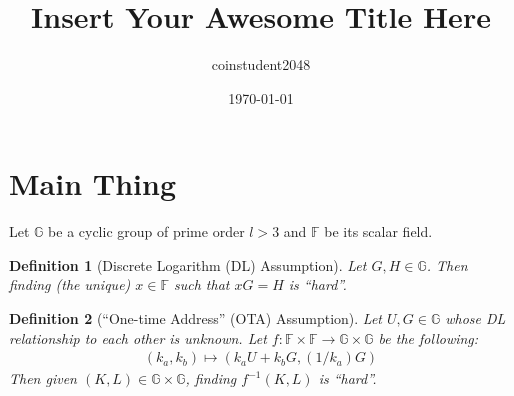 \documentclass{article}
\title{Insert Your Awesome Title Here}
\author{coinstudent2048}
\date{\today}
\newtheorem{definition}{Definition}[section]
\begin{document}
\maketitle


\section{Main Thing}
\noindent Let $\mathbb{G}$ be a cyclic group of prime order $l>3$ and $\mathbb{F}$ be its scalar field.

\begin{definition}[Discrete Logarithm (DL) Assumption]
Let $G, H\in\mathbb{G}$. Then finding (the unique) $x\in\mathbb{F}$ such that $xG=H$ is ``hard''.
\end{definition}

\begin{definition}[``One-time Address'' (OTA) Assumption]
Let $U, G\in\mathbb{G}$ whose DL relationship to each other is unknown. Let $f:\mathbb{F}\times\mathbb{F}\rightarrow\mathbb{G}\times\mathbb{G}$ be the following:
\begin{align*}
    (k_a, k_b) \mapsto (k_a U + k_b G, (1/k_a)G)
\end{align*}
Then given $(K, L)\in\mathbb{G}\times\mathbb{G}$, finding $f^{-1}(K,L)$ is ``hard''.
\end{definition}
\end{document}
